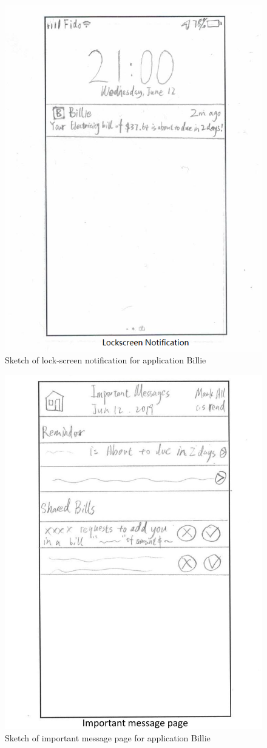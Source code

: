 \documentclass{sigchi}
\begin{document}
\begin{figure}[h!]
\centering
  \includegraphics[width=0.6\columnwidth]{13-notification.png}
  \caption{Sketch of lock-screen notification for application Billie}
  \label{fig:figure28}
\end{figure}
\begin{figure}[h!]
\centering
  \includegraphics[width=0.6\columnwidth]{14-important-message-page.jpg}
  \caption{Sketch of important message page for application Billie}
  \label{fig:figure29}
\end{figure}
\end{document}
